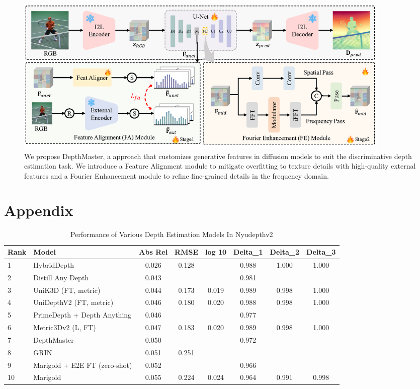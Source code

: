 \documentclass{article}
\begin{document}
\begin{figure}[h!]
  \centering
  \includegraphics[width=0.9\textwidth]{images/framework_v6.png}
  \caption{We propose DepthMaster, a approach that customizes generative features in diffusion models to suit the discriminative depth estimation task. We introduce a Feature Alignment module to mitigate overfitting to texture details with high-quality external features and a Fourier Enhancement module to refine fine-grained details in the frequency domain.}
\end{figure}


\newpage

\section{Appendix}

\begin{table}[h!]
    \centering
    \small
    \label{tab:depth_models}
    \begin{tabular}{l l c c c c c c}
        \toprule
        Rank & Model & Abs Rel & RMSE & log 10 & Delta_1 & Delta_2 & Delta_3 \\
        \midrule
        1 & HybridDepth & 0.026 & 0.128 & & 0.988 & 1.000 & 1.000 \\
        2 & Distill Any Depth & 0.043 & & & 0.981 & & \\
        3 & UniK3D (FT, metric) & 0.044 & 0.173 & 0.019 & 0.989 & 0.998 & 1.000 \\
        4 & UniDepthV2 (FT, metric) & 0.046 & 0.180 & 0.020 & 0.988 & 0.998 & 1.000 \\
        5 & PrimeDepth + Depth Anything & 0.046 & & & 0.977 & & \\
        6 & Metric3Dv2 (L, FT) & 0.047 & 0.183 & 0.020 & 0.989 & 0.998 & 1.000 \\
        7 & DepthMaster & 0.050 & & & 0.972 & & \\
        8 & GRIN & 0.051 & 0.251 & & & & \\
        9 & Marigold + E2E FT (zero-shot) & 0.052 & & & 0.966 & & \\
        10 & Marigold & 0.055 & 0.224 & 0.024 & 0.964 & 0.991 & 0.998 \\
        \bottomrule
    \end{tabular}
    \caption{Performance of Various Depth Estimation Models In Nyudepthv2}
\end{table}
\end{document}
